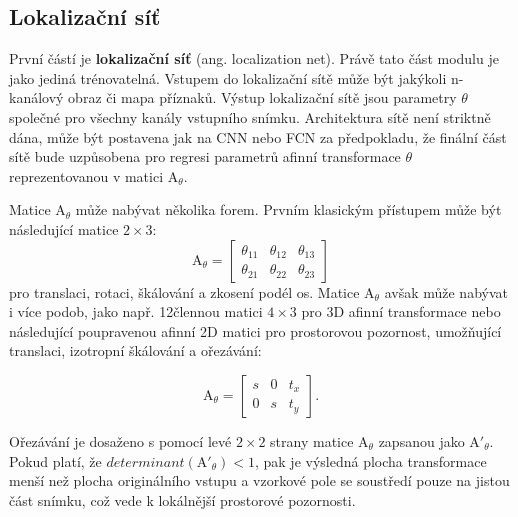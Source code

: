 \subsection{Lokalizační síť}

První částí je \textbf{lokalizační síť} (ang. localization net). Právě tato část modulu je jako jediná trénovatelná. Vstupem do lokalizační sítě může být jakýkoli n-kanálový obraz či mapa příznaků. Výstup lokalizační sítě jsou parametry $\theta$ společné pro všechny kanály vstupního snímku. Architektura sítě není striktně dána, může být postavena jak na CNN nebo FCN za předpokladu, že finální část sítě bude uzpůsobena pro regresi parametrů afinní transformace $\theta$ reprezentovanou v matici ${\displaystyle \mathrm {A} }_\theta$.

Matice ${\displaystyle \mathrm {A} }_\theta$ může nabývat několika forem. Prvním klasickým přístupem může být následující matice $2\times3$:
\begin{equation}
    {\displaystyle \mathrm {A} }_\theta = 
    \begin{bmatrix}
        \theta_{11} & \theta_{12} & \theta_{13} \\
        \theta_{21} & \theta_{22} & \theta_{23}
    \end{bmatrix}
    \label{eq:stn_6_theta}
\end{equation}
pro translaci, rotaci, škálování a zkosení podél os. Matice ${\displaystyle \mathrm {A} }_\theta$ avšak může nabývat i více podob, jako např. 12člennou matici $4\times3$ pro 3D afinní transformace nebo následující poupravenou afinní 2D matici pro prostorovou pozornost, umožňující translaci, izotropní škálování a ořezávání:

\begin{equation}
    {\displaystyle \mathrm {A} }_\theta = 
    \begin{bmatrix}
        s & 0 & t_x \\
        0 & s & t_y
    \end{bmatrix}.
    \label{eq:stn_3_theta}
\end{equation}

Ořezávání je dosaženo s pomocí levé $2\times2$ strany matice ${\displaystyle \mathrm {A} }_\theta$ zapsanou jako ${\displaystyle \mathrm {A'} }_\theta$. Pokud platí, že $determinant({\displaystyle \mathrm {A'} }_\theta) < 1$, pak je výsledná plocha transformace menší než plocha originálního vstupu a vzorkové pole se soustředí pouze na jistou část snímku, což vede k lokálnější prostorové pozornosti.


